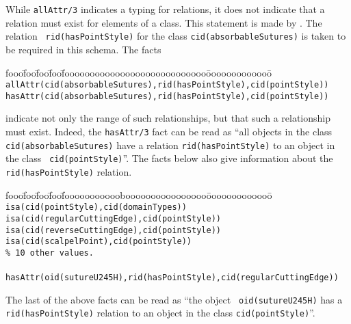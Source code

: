 \begin{example} \rm \label{ex:hasAttr}
While {\tt allAttr/3} indicates a typing for relations, it does not
indicate that a relation must exist for elements of a class.  This
statement is made by .  The relation {\tt
rid(hasPointStyle)} for the class {\tt cid(absorbableSutures)} is
taken to be required in this schema.  The facts
%
{\small
\begin{tabbing}
fooo\=foo\=foo\=foo\=foooooooooooooooooooooooooooo\=ooooooooooooo\=\kill
\> {\tt allAttr(cid(absorbableSutures),rid(hasPointStyle),cid(pointStyle)) } \\
\> {\tt hasAttr(cid(absorbableSutures),rid(hasPointStyle),cid(pointStyle)) }
\end{tabbing}
}
%
\noindent
indicate not only the range of such relationships, but that such a
relationship must exist.  Indeed, the {\tt hasAttr/3} fact can be read
as ``all objects in the class {\tt cid(absorbableSutures)} have a
relation {\tt rid(hasPointStyle)} to an object in the class {\tt
cid(pointStyle)}''.  The facts below also give information about the
{\tt rid(hasPointStyle)} relation.
%
{\small
\begin{tabbing}
fooo\=foo\=foo\=foo\=foooooooooooboooooooooooooooo\=ooooooooooooo\=\kill
\> {\tt isa(cid(pointStyle),cid(domainTypes))} \\
\> {\tt isa(cid(regularCuttingEdge),cid(pointStyle))} \\
\> {\tt isa(cid(reverseCuttingEdge),cid(pointStyle))} \\
\> {\tt isa(cid(scalpelPoint),cid(pointStyle))} \\
\> {\tt \% 10 other values.} \\
\\
\> {\tt hasAttr(oid(sutureU245H),rid(hasPointStyle),cid(regularCuttingEdge))}
\end{tabbing}
} 
\noindent
The last of the above facts can be read as ``the object {\tt
oid(sutureU245H)} has a {\tt rid(hasPointStyle)} relation to an object
in the class {\tt cid(pointStyle)}''.  
\end{example}

